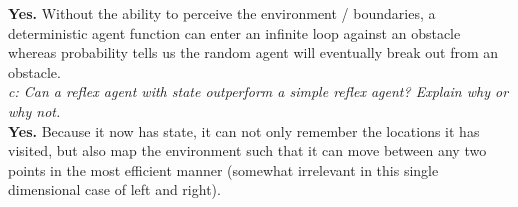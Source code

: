 \documentclass[journal]{IEEEtran}
\begin{document}
\noindent \textbf{Yes.} Without the ability to perceive the environment 
/ boundaries, a deterministic agent function can enter an infinite loop 
against an obstacle whereas probability tells us the random agent will 
eventually break out from an obstacle. \\

\noindent \textit{c: Can a reflex agent with state outperform a simple 
reflex agent? Explain why or why not.} \\

\noindent \textbf{Yes.} Because it now has state, it can not only remember 
the locations it has visited, but also map the environment such that it can 
move between any two points in the most efficient manner (somewhat irrelevant 
in this single dimensional case of left and right). \\
\end{document}
